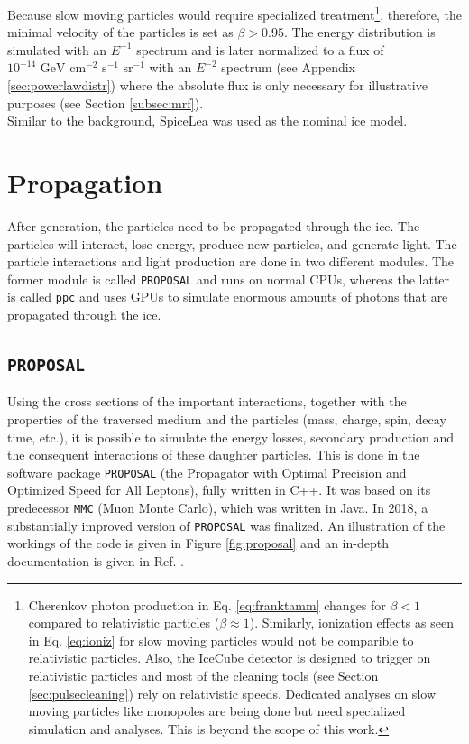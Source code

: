 \noindent Because slow moving particles would require specialized treatment\footnote{Cherenkov photon production in Eq. \ref{eq:franktamm} changes for $\beta < 1$ compared to relativistic particles ($\beta \approx 1$). Similarly, ionization effects as seen in Eq. \ref{eq:ioniz} for slow moving particles would not be comparible to relativistic particles. Also, the IceCube detector is designed to trigger on relativistic particles and most of the cleaning tools (see Section \ref{sec:pulsecleaning}) rely on relativistic speeds. Dedicated analyses on slow moving particles like monopoles are being done but need specialized simulation and analyses. This is beyond the scope of this work.}, therefore, the minimal velocity of the particles is set as $\beta > 0.95$. The energy distribution is simulated with an $E^{-1}$ spectrum and is later normalized to a flux of $10^{-14} \textrm{ GeV } \textrm{cm}^{-2} \textrm{ s}^{-1} \textrm{ sr}^{-1}$ with an $E^{-2}$ spectrum (see Appendix \ref{sec:powerlawdistr}) where the absolute flux is only necessary for illustrative purposes (see Section \ref{subsec:mrf}).\\

\noindent Similar to the background, SpiceLea was used as the nominal ice model.

\section{Propagation}
After generation, the particles need to be propagated through the ice. The particles will interact, lose energy, produce new particles, and generate light. The particle interactions and light production are done in two different modules. The former module is called \texttt{PROPOSAL} and runs on normal CPUs, whereas the latter is called \texttt{ppc} and uses GPUs to simulate enormous amounts of photons that are propagated through the ice.


\subsection{\texttt{PROPOSAL}}
Using the cross sections of the important interactions, together with the properties of the traversed medium and the particles (mass, charge, spin, decay time, etc.), it is possible to simulate the energy losses, secondary production and the consequent interactions of these daughter particles. This is done in the software package \texttt{PROPOSAL}  (the Propagator with Optimal Precision and Optimized Speed for All Leptons), fully written in C++. It was based on its predecessor \texttt{MMC} (Muon Monte Carlo), which was written in Java. In 2018, a substantially improved version of \texttt{PROPOSAL} was finalized. An illustration of the workings of the code is given in Figure \ref{fig:proposal} and an in-depth documentation is given in Ref. \cite{Dunsch:2018nsc}.

